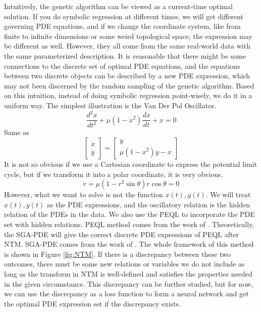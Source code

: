 \documentclass[12pt]{article}
\begin{document}
Intuitively, the genetic algorithm can be viewed as a current-time optimal solution. If you do symbolic regression at different times, we will get different governing PDE equations, and if we change the coordinate system, like from finite to infinite dimensions or some weird topological space, the expression may be different as well. However, they all come from the same real-world data with the same parameterized description. It is reasonable that there might be some connections to the discrete set of optimal PDE equations, and the equations between two discrete objects can be described by a new PDE expression, which may not been discerned by the random sampling of the genetic algorithm. Based on this intuition, instead of doing symbolic regression point-wisely, we do it in a uniform way. The simplest illustration is the Van Der Pol Oscillator.
\[
\frac{d^2x}{dt^2}+\mu (1-x^2)\frac{dx}{dt}+x=0
\]
Same as 
\[
\begin{bmatrix}
    \Dot{x}\\
    \Dot{y}
\end{bmatrix}=\begin{bmatrix}
    y\\
    \mu(1-x^2)y-x
\end{bmatrix}
\]
It is not so obvious if we use a Cartesian coordinate to express the potential limit cycle, but if we transform it into a polar coordinate, it is very obvious. 
\[
\Dot{r}=\mu (1-r^2 \sin{\theta})r \cos{\theta}=0
\]
However, what we want to solve is not the function $x(t),y(t)$. We will treat $x(t),y(t)$ as the PDE expressions, and the oscillatory relation is the hidden relation of the PDEs in the data. We also use the PEQL to incorporate the PDE set with hidden relations. PEQL method comes from the work of \citet{Zhang2022DeepLA}. Theoretically, the SGA-PDE will give the correct discrete PDE expressions of PEQL after NTM. SGA-PDE comes from the work of \citet{PhysRevResearch.4.023174}. The whole framework of this method is shown in Figure \ref{fig:NTM}. If there is a discrepancy between these two outcomes, there must be some new relations or variables we do not include as long as the transform in NTM is well-defined and satisfies the properties needed in the given circumstance. This discrepancy can be further studied, but for now, we can use the discrepancy as a loss function to form a neural network and get the optimal PDE expression set if the discrepancy exists. 
\end{document}

